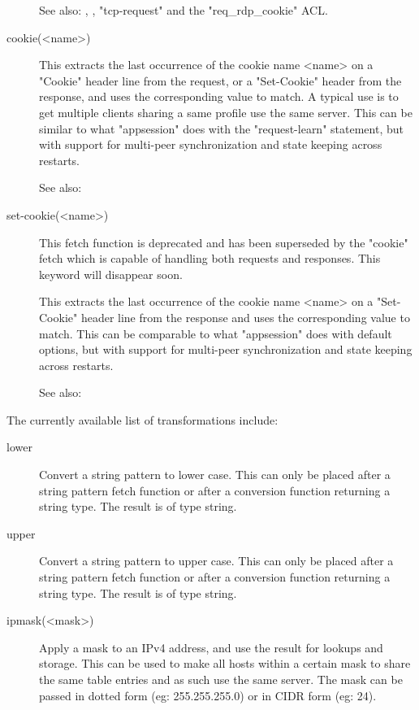 \begin{description}
See also: , ,
               "tcp-request" and the "req\_rdp\_cookie" ACL.

\item[cookie(<name>)]
               This extracts the last occurrence of the cookie name <name> on a
               "Cookie" header line from the request, or a "Set-Cookie" header
               from the response, and uses the corresponding value to match. A
               typical use is to get multiple clients sharing a same profile
               use the same server. This can be similar to what "appsession"
               does with the "request-learn" statement, but with support for
               multi-peer synchronization and state keeping across restarts.


See also: 

\item[set-cookie(<name>)]
               This fetch function is deprecated and has been superseded by the
               "cookie" fetch which is capable of handling both requests and
               responses. This keyword will disappear soon.

               This extracts the last occurrence of the cookie name <name> on a
               "Set-Cookie" header line from the response and uses the
               corresponding value to match. This can be comparable to what
               "appsession" does with default options, but with support for
                multi-peer synchronization and state keeping across restarts.
                

See also: 
\end{description}

The currently available list of transformations include:

\begin{description}
\item[lower]
               Convert a string pattern to lower case. This can only be placed
               after a string pattern fetch function or after a conversion
               function returning a string type. The result is of type string.

\item[upper]
               Convert a string pattern to upper case. This can only be placed
               after a string pattern fetch function or after a conversion
               function returning a string type. The result is of type string.

\item[ipmask(<mask>)]
               Apply a mask to an IPv4 address, and use the result for lookups
               and storage. This can be used to make all hosts within a
               certain mask to share the same table entries and as such use
               the same server. The mask can be passed in dotted form (eg:
               255.255.255.0) or in CIDR form (eg: 24).
\end{description}